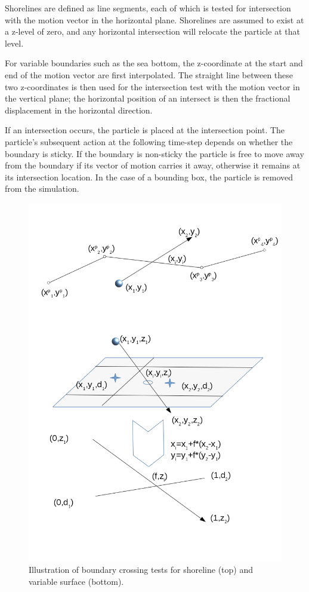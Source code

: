 \documentclass[a4paper]{article}
\begin{document}
Shorelines are defined as line segments, each of which is tested for intersection with the motion vector in the horizontal plane.
Shorelines are assumed to exist at a z-level of zero, and any horizontal intersection will relocate the particle at that level.

For variable boundaries such as the sea bottom, the z-coordinate at the start and end of the motion vector are first interpolated.
The straight line between these two z-coordinates is then used for the intersection test with the motion vector in the vertical plane;
the horizontal position of an intersect is then the fractional displacement in the horizontal direction.

If an intersection occurs, the particle is placed at the intersection point. 
The particle's subsequent action at the following time-step depends on whether the boundary is sticky.
If the boundary is non-sticky the particle is free to move away from the boundary if its vector of motion carries it away, otherwise it remains at its intersection location.
In the case of a bounding box, the particle is removed from the simulation.

\begin{figure}
\includegraphics[width=\textwidth]{intersect.png}
\caption{Illustration of boundary crossing tests for shoreline (top) and variable surface (bottom).}
\end{figure}
\end{document}
